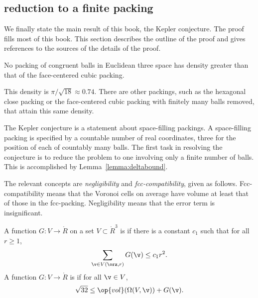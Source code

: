 \subsection{reduction to a finite packing}

We finally state the main result of this book, the Kepler conjecture.
The proof fills most of this book. This section describes the
outline of the proof and gives references to the sources of the
details of the proof.


\begin{theorem} 
\label{theorem:kepler}   
%
No packing of congruent balls in Euclidean three space has density
greater than that of the face-centered cubic packing.
\end{theorem}

\begin{remark}
This density is $\pi/\sqrt{18}\approx 0.74.$  There are other
packings, such as the hexagonal close packing or the face-centered cubic
packing with finitely many balls removed, that attain this
same density.
\end{remark}

The Kepler conjecture is a statement about space-filling packings.  A
space-filling packing is specified by a countable number of real coordinates,
three for the position of each of countably many balls.  The first
task in resolving the conjecture is to reduce the problem to one
involving only a finite number of balls.  This is accomplished by
Lemma~\ref{lemma:deltabound}.

The relevant concepts are {\it negligibility} and {\it
  fcc-compatibility}, given as follows.  Fcc-compatibility means that
the Voronoi cells on average have volume at least that of those in the
fcc-packing.  Negligibility means that the error term is insignificant.


\begin{definition}\label{def:negligible}
A function $G:V\to \ring{R}$ on a set $V\subset\ring{R}^3$
is 
if there is a constant $c_1$ such that for all $r\ge1$,
\begin{displaymath}\sum_{\v\in V(\orz,r)} G(\v) \le c_1
r^2.\end{displaymath}
A function $G: V\to\ring{R}$ is
if for all $\v\in V$, 
\begin{displaymath}\sqrt{32}\le \op{vol}(\Omega(V,\v)) +
G(\v).\end{displaymath}
%
%
%
\end{definition}


